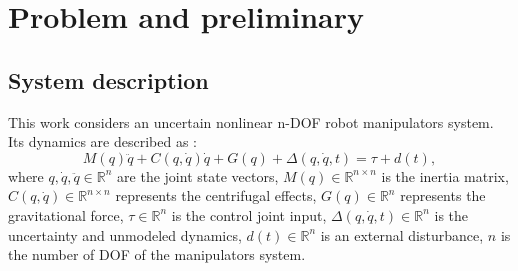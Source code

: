 \documentclass[pdflatex,sn-mathphys-num]{sn-jnl}%
\theoremstyle{thmstyleone}%
\theoremstyle{thmstyletwo}%
\theoremstyle{thmstylethree}%
\begin{document}



\section{Problem and preliminary}


\subsection{System description}
\par This work considers an uncertain nonlinear n-DOF robot manipulators system. Its dynamics are described as \cite{SciaviccoSiciliano_2012_ModellingControl,BagheriEtAl_2019_Feedbacklinearization}:
\begin{equation}
	M(q)\ddot{q} + C(q, \dot{q})\dot{q} + G(q)+ \Delta(q, \dot{q}, t)= \tau + d(t),
	\label{eq:1}
\end{equation}
where $ q, \dot{q}, \ddot{q} \in \mathbb{R}^n $ are the joint state vectors, $M(q) \in \mathbb{R}^{n\times n}$ is the inertia matrix, $C(q, \dot{q}) \in \mathbb{R}^{n\times n} $ represents the centrifugal effects, $G(q) \in \mathbb{R}^n $ represents the gravitational force, $\tau \in \mathbb{R}^n$ is the control joint input, $\Delta(q, \dot{q}, t) \in \mathbb{R}^n$ is the uncertainty and unmodeled dynamics, $d(t) \in \mathbb{R}^n$ is an external disturbance, $n$ is the number of DOF of the manipulators system.
\end{document}
